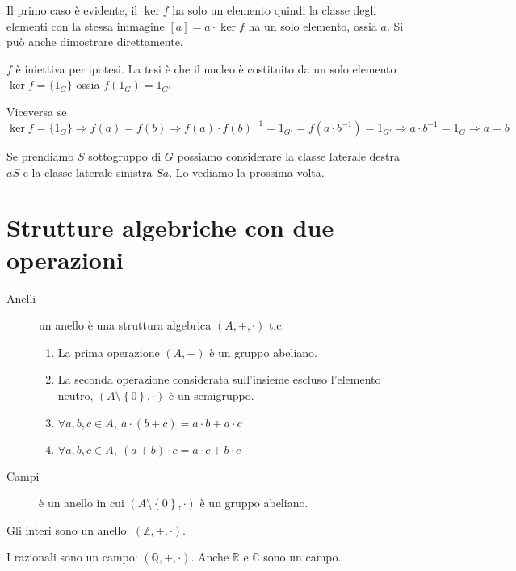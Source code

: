 Il primo caso \`e evidente, il $\ker f$ ha solo un elemento quindi la classe degli elementi con la stessa immagine $[a] = a \cdot \ker f$ ha un solo elemento, ossia $a$. Si pu\`o anche dimostrare direttamente.

$f$ \`e iniettiva per ipotesi. La tesi \`e che il nucleo \`e costituito da un solo elemento $\ker f = \{ 1_G \} $ ossia $f(1_G) = 1_{G'}$

Viceversa se $\ker f = \{ 1_G \} \Rightarrow f(a) = f(b) \Rightarrow f(a) \cdot f(b)^{-1} = 1_{G'} = f(a \cdot b^{-1}) = 1_{G'} \Rightarrow a \cdot b^{-1} = 1_G \Rightarrow a = b$

Se prendiamo $S$ sottogruppo di $G$ possiamo considerare la classe laterale destra $a S$ e la classe laterale sinistra $S a$. Lo vediamo la prossima volta. 






\section{Strutture algebriche con due operazioni}

\begin{description}
    \item[Anelli] un anello \`e una struttura algebrica $(A, +, \cdot)$ t.c. 
    \begin{enumerate}
        \item La prima operazione $\left( A, + \right )$ \`e un gruppo abeliano.
        \item La seconda operazione considerata sull'insieme escluso l'elemento neutro, $(A \setminus \left \{ 0 \right \}, \cdot )$ \`e un semigruppo.
        \item $ \forall a, b, c \in A , \ a \cdot (b + c) = a \cdot b + a \cdot c $
        \item $ \forall a, b, c \in A , \ (a + b) \cdot c = a \cdot c + b \cdot c $
    \end{enumerate}
    \item[Campi] \`e un anello in cui $( A \setminus \left \{ 0 \right \}, \cdot )$ \`e un gruppo abeliano.
\end{description}

Gli interi sono un anello: $\left ( \mathbb{Z}, +, \cdot \right )$.

I razionali sono un campo: $\left ( \mathbb{Q}, +, \cdot \right )$. Anche $\mathbb{R}$ e $\mathbb{C}$ sono un campo.